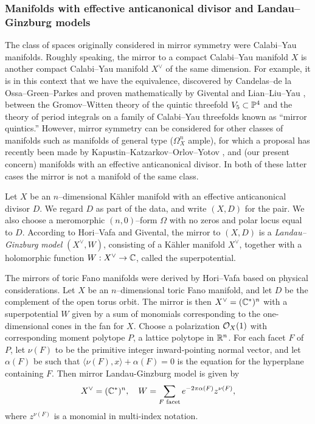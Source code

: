 \documentclass[12pt]{amsart}
\begin{document}


\subsubsection{Manifolds with effective anticanonical divisor and Landau--Ginzburg models}
\label{sec:intro-fano}

The class of spaces originally considered in mirror symmetry were
Calabi--Yau manifolds. Roughly speaking, the mirror to a compact
Calabi--Yau manifold $X$ is another compact Calabi--Yau manifold
$X^\vee$ of the same dimension. For example, it is in this context
that we have the equivalence, discovered by Candelas--de la
Ossa--Green--Parkes \cite{candelas-etal} and proven mathematically by
Givental \cite{givental-equivariant-GW} and Lian--Liu--Yau \cite{lly},
between the Gromov--Witten theory of the quintic threefold $V_5
\subset \mathbb{P}^4$ and the theory of period integrals on a family of
Calabi--Yau threefolds known as ``mirror quintics.'' However, mirror
symmetry can be considered for other classes of manifolds such as
manifolds of general type ($\Omega^n_X$ ample), for which a proposal
has recently been made by Kapustin--Katzarkov--Orlov--Yotov
\cite{hms-general-type}, and (our present concern) manifolds with an
effective anticanonical divisor. In both of these latter cases the
mirror is not a manifold of the same class.

Let $X$ be an $n$--dimensional K\"{a}hler manifold with an effective
anticanonical divisor $D$. We regard $D$ as part of the data, and
write $(X,D)$ for the pair. We also choose a meromorphic $(n,0)$--form
$\Omega$ with no zeros and polar locus equal to $D$. According to
Hori--Vafa \cite{hori-vafa} and Givental, the mirror to $(X,D)$ is a
\emph{Landau--Ginzburg model} $(X^\vee, W)$, consisting of a
K\"{a}hler manifold $X^\vee$, together with a holomorphic function $W:
X^\vee \to \mathbb{C}$, called the superpotential.

The mirrors of toric Fano manifolds were derived by Hori--Vafa
\cite[\S 5.3]{hori-vafa} based on physical considerations. Let $X$ be
an $n$--dimensional toric Fano manifold, and let $D$ be the complement
of the open torus orbit. The mirror is then $X^\vee = (\mathbb{C}^*)^n$ with a superpotential $W$ given by a sum of monomials corresponding to the one-dimensional cones in the fan for $X$. 
 Choose a polarization $\mathcal{O}_X(1)$ with corresponding moment
polytope $P$, a lattice polytope in $\mathbb{R}^n$. For each facet $F$ of $P$,
let $\nu(F)$ to be the primitive integer inward-pointing normal
vector, and let $\alpha(F)$ be such that $\langle \nu(F),x\rangle +
\alpha(F) = 0$ is the equation for the hyperplane containing $F$. Then
mirror Landau-Ginzburg model is given by
\begin{equation}
  \label{eq:hori-vafa}
  X^\vee = (\mathbb{C}^*)^n, \quad W = \sum_{F \text{ facet}} e^{-2\pi\alpha(F)}z^{\nu(F)},
\end{equation}
where $z^{\nu(F)}$ is a monomial in multi-index notation.
\end{document}
